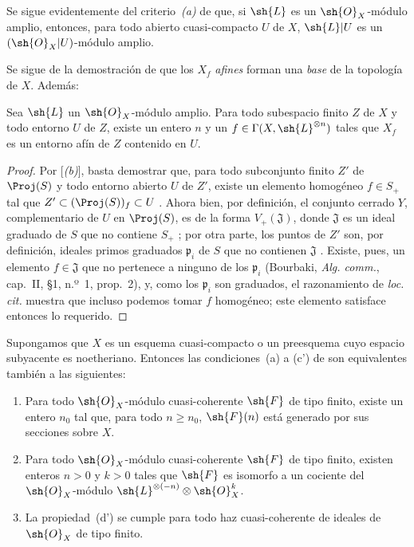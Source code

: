 \documentclass[oneside,10pt]{amsart}
\renewcommand{\geq}{\geqslant}
\newcommand{\oldpage}[2][]{\marginnote{\normalfont\footnotesize\textbf{#1}~|~#2}\ignorespaces}
\let\EGAOriginalLabel\label
\renewcommand{\label}[1]{\phantomsection\EGAOriginalLabel{#1}}
\begin{document}
Se sigue evidentemente del criterio~\emph{(a)} de  que, si $\sh{L}$ es un $\sh{O}_X$-módulo amplio, entonces, para todo abierto cuasi-compacto $U$ de $X$, $\sh{L}|U$ es un $(\sh{O}_X|U)$-módulo amplio.

Se sigue de la demostración de  que los $X_f$ \emph{afines} forman una \emph{base} de la topología de $X$.
Además:

\begin{corollary}[4.5.4]
\label{II.4.5.4}
Sea $\sh{L}$ un $\sh{O}_X$-módulo amplio.
Para todo subespacio finito $Z$ de $X$ y todo entorno $U$ de $Z$, existe un entero $n$ y un $f\in\Gamma(X,\sh{L}^{\otimes n})$ tales que $X_f$ es un entorno afín de $Z$ contenido en $U$.
\end{corollary}

\begin{proof}
\oldpage[II]{85}
Por [\emph{(b)}], basta demostrar que, para todo subconjunto finito $Z'$ de $\Proj(S)$ y todo entorno abierto $U$ de $Z'$, existe un elemento homogéneo $f\in S_+$ tal que $Z'\subset(\Proj(S))_f\subset U$ .
Ahora bien, por definición, el conjunto cerrado $Y$, complementario de $U$ en $\Proj(S)$, es de la forma $V_+(\mathfrak J)$, donde $\mathfrak J$ es un ideal graduado de $S$ que no contiene $S_+$ ;
por otra parte, los puntos de $Z'$ son, por definición, ideales primos graduados $\mathfrak{p}_i$ de $S$ que no contienen $\mathfrak J$ .
Existe, pues, un elemento $f\in\mathfrak J$ que no pertenece a ninguno de los $\mathfrak{p}_i$ (Bourbaki, \emph{Alg. comm.}, cap.~II, \S1, n.º~1, prop.~2), y, como los $\mathfrak{p}_i$ son graduados, el razonamiento de \emph{loc. cit.} muestra que incluso podemos tomar $f$ homogéneo;
este elemento satisface entonces lo requerido.
\end{proof}

\begin{proposition}[4.5.5]
\label{II.4.5.5}
Supongamos que $X$ es un esquema cuasi-compacto o un preesquema cuyo espacio subyacente es noetheriano.
Entonces las condiciones~\textup{(a)} a \textup{(c')} de  son equivalentes también a las siguientes:
\begin{enumerate}
  \item[\rm{(d)}] Para todo $\sh{O}_X$-módulo cuasi-coherente $\sh{F}$ de tipo finito, existe un entero $n_0$ tal que, para todo $n\geq n_0$, $\sh{F}(n)$ está generado por sus secciones sobre $X$.
  \item[\rm{(d')}] Para todo $\sh{O}_X$-módulo cuasi-coherente $\sh{F}$ de tipo finito, existen enteros $n>0$ y $k>0$ tales que $\sh{F}$ es isomorfo a un cociente del $\sh{O}_X$-módulo $\sh{L}^{\otimes(-n)}\otimes\sh{O}_X^k$.
  \item[\rm{(d'')}] La propiedad~\textup{(d')} se cumple para todo haz cuasi-coherente de ideales de $\sh{O}_X$ de tipo finito.
\end{enumerate}
\end{proposition}
\end{document}

